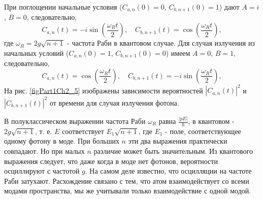 При поглощении начальные условия ($C_{a,n}\left(0\right) = 0$, $C_{b,n+1}\left(0\right)
= 1$) дают $A = i$, $B = 0$, следовательно,  
\begin{equation}
C_{a,n}\left(t\right) = -i \sin\left(\frac{\omega_R t}{2}\right), \quad
C_{b, n + 1}\left(t\right) = \cos\left(\frac{\omega_R t}{2}\right), 
\end{equation}
где $\omega_R = 2g\sqrt{n + 1}$ - частота Раби в квантовом случае. Для случая
излучения из начальных условий ($C_{a,n}\left(0\right) = 1$,
$C_{b,n+1}\left(0\right) = 0$) имеем $A = 0$, $B = 1$, следовательно, 
\begin{equation}
C_{a,n}\left(t\right) = \cos\left(\frac{\omega_R t}{2}\right), \quad
C_{b, n + 1}\left(t\right) = -i \sin\left(\frac{\omega_R t}{2}\right), 
\end{equation}
На рис. \ref{figPart1Ch2_5} изображены зависимости вероятностей 
$\left|C_{a,n}\left(t\right)\right|^2$ и 
$\left|C_{b, n + 1}\left(t\right)\right|^2$  от времени для случая
излучения фотона.



В полуклассическом выражении частота Раби $\omega_R$ равна 
$\frac{\left|p E\right|}{\hbar}$,  в квантовом - $2g\sqrt{n + 1}$,
т. е. $E$  соответствует $E_1\sqrt{n + 1}$,  где $E_1$ - поле,
соответствующее одному фотону в моде. При больших $n$ эти два
выражения практически совпадают. Но при малых $n$ различие может быть 
значительным. Из квантового  выражения следует, что даже когда в моде
нет фотонов, вероятности осциллируют с частотой  $g$.  На самом деле 
известно, что осцилляции на частоте Раби затухают. Расхождение связано
с тем, что атом взаимодействует со всеми модами пространства, мы же
учитывали только взаимодействие с одной модой.  

